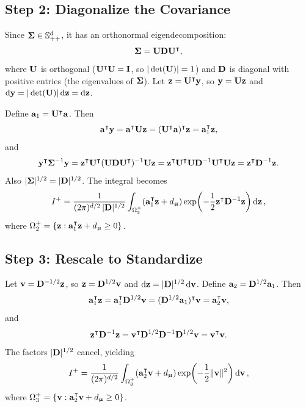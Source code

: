 \documentclass[11pt, letterpaper]{article}
\newcommand{\bSigma}{\vb{\Sigma}}
\newcommand{\bmu}{\boldsymbol{\upmu}}
\begin{document}
\subsection{Step 2: Diagonalize the Covariance}

Since $\bSigma \in \mathbb{S}^d_{++}$, it has an orthonormal eigendecomposition:
\begin{equation}
    \bSigma = \vb{U}\vb{D}\vb{U}^{\intercal},
\end{equation}
where $\vb{U}$ is orthogonal ($\vb{U}^{\intercal}\vb{U} = \vb{I}$, so $|\det(\vb{U})| = 1$) and $\vb{D}$ is diagonal with positive entries (the eigenvalues of $\bSigma$). Let $\vb{z} = \vb{U}^{\intercal}\vb{y}$, so $\vb{y} = \vb{U}\vb{z}$ and $\dd{\vb{y}} = |\det(\vb{U})|\dd{\vb{z}} = \dd{\vb{z}}$.

Define $\vb{a}_1 = \vb{U}^{\intercal}\vb{a}$. Then
\begin{equation}
    \vb{a}^{\intercal}\vb{y} = \vb{a}^{\intercal}\vb{U}\vb{z} = (\vb{U}^{\intercal}\vb{a})^{\intercal}\vb{z} = \vb{a}_1^{\intercal}\vb{z},
\end{equation}
and
\begin{equation}
    \vb{y}^{\intercal}\bSigma^{-1}\vb{y} = \vb{z}^{\intercal}\vb{U}^{\intercal}(\vb{U}\vb{D}\vb{U}^{\intercal})^{-1}\vb{U}\vb{z} = \vb{z}^{\intercal}\vb{U}^{\intercal}\vb{U}\vb{D}^{-1}\vb{U}^{\intercal}\vb{U}\vb{z} = \vb{z}^{\intercal}\vb{D}^{-1}\vb{z}.
\end{equation}
Also $|\bSigma|^{1/2} = |\vb{D}|^{1/2}$. The integral becomes
\begin{equation}
    I^+ = \frac{1}{(2\pi)^{d/2}\, |\vb{D}|^{1/2}} \int_{\Omega^+_2} (\vb{a}_1^{\intercal}\vb{z} + d_{\bmu}) \exp\!\left(-\frac{1}{2}\vb{z}^{\intercal}\vb{D}^{-1}\vb{z}\right) \dd{\vb{z}},
\end{equation}
where $\Omega^+_2 = \{\vb{z} : \vb{a}_1^{\intercal}\vb{z} + d_{\bmu} \geq 0\}$.

\subsection{Step 3: Rescale to Standardize}

Let $\vb{v} = \vb{D}^{-1/2}\vb{z}$, so $\vb{z} = \vb{D}^{1/2}\vb{v}$ and $\dd{\vb{z}} = |\vb{D}|^{1/2}\dd{\vb{v}}$. Define $\vb{a}_2 = \vb{D}^{1/2}\vb{a}_1$. Then
\begin{equation}
    \vb{a}_1^{\intercal}\vb{z} = \vb{a}_1^{\intercal}\vb{D}^{1/2}\vb{v} = (\vb{D}^{1/2}\vb{a}_1)^{\intercal}\vb{v} = \vb{a}_2^{\intercal}\vb{v},
\end{equation}
and
\begin{equation}
    \vb{z}^{\intercal}\vb{D}^{-1}\vb{z} = \vb{v}^{\intercal}\vb{D}^{1/2}\vb{D}^{-1}\vb{D}^{1/2}\vb{v} = \vb{v}^{\intercal}\vb{v}.
\end{equation}
The factors $|\vb{D}|^{1/2}$ cancel, yielding
\begin{equation}\label{eq:after_rescale}
    I^+ = \frac{1}{(2\pi)^{d/2}} \int_{\Omega^+_3} (\vb{a}_2^{\intercal}\vb{v} + d_{\bmu}) \exp\!\left(-\frac{1}{2}\|\vb{v}\|^2\right) \dd{\vb{v}},
\end{equation}
where $\Omega^+_3 = \{\vb{v} : \vb{a}_2^{\intercal}\vb{v} + d_{\bmu} \geq 0\}$.
\end{document}
